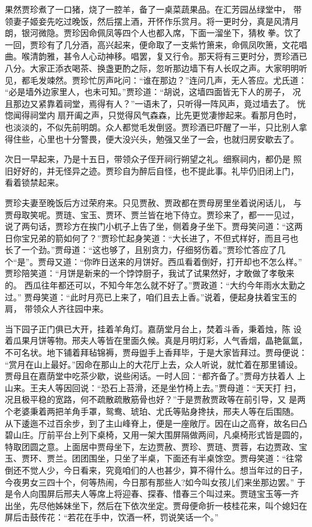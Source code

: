 果然贾珍煮了一口猪，烧了一腔羊，备了一桌菜蔬果品。在汇芳园丛绿堂中，
带领妻子姬妾先吃过晚饭，然后摆上酒，开怀作乐赏月。将一更时分，真是风清月
朗，银河微隐。贾珍因命佩凤等四个人也都入席，下面一溜坐下，猜枚拳。饮了
一回，贾珍有了几分酒，高兴起来，便命取了一支紫竹箫来，命佩凤吹箫，文花唱
曲。喉清韵雅，甚令人心动神移。唱罢，复又行令。那天将有三更时分，贾珍酒已
八分。大家正添衣喝茶、换盏更酌之际，忽听那边墙下有人长叹之声。大家明明听
见，都毛发竦然。贾珍忙厉声叱问：“谁在那边？”连问几声，无人答应。尤氏道：
“必是墙外边家里人，也未可知。”贾珍道：“胡说，这墙四面皆无下人的房子，
况且那边又紧靠着祠堂，焉得有人？”一语未了，只听得一阵风声，竟过墙去了。
恍惚闻得祠堂内扇开阖之声，只觉得风气森森，比先更觉凄惨起来。看那月色时，
也淡淡的，不似先前明朗。众人都觉毛发倒竖。贾珍酒已吓醒了一半，只比别人拿
得住些，心里也十分警畏，便大没兴头，勉强又坐了一会，也就归房安歇去了。

次日一早起来，乃是十五日，带领众子侄开祠行朔望之礼。细察祠内，都仍是
照旧好好的，并无怪异之迹。贾珍自为醉后自怪，也不提此事。礼毕仍旧闭上门，
看着锁禁起来。

贾珍夫妻至晚饭后方过荣府来。只见贾赦、贾政都在贾母房里坐着说闲话儿，
与贾母取笑呢。贾琏、宝玉、贾环、贾兰皆在地下侍立。贾珍来了，都一一见过，
说了两句话，贾珍方在挨门小杌子上告了坐，侧着身子坐下。贾母笑问道：“这两
日你宝兄弟的箭如何了？”贾珍忙起身笑道：“大长进了，不但式样好，而且弓也
长了一个劲。”贾母道：“这也够了，且别贪力，仔细努伤着。”贾珍忙答应了几
个“是”。贾母又道：“你昨日送来的月饼好。西瓜看着倒好，打开却也不怎么样。”
贾珍陪笑道：“月饼是新来的一个饽饽厨子，我试了试果然好，才敢做了孝敬来的。
西瓜往年都还可以，不知今年怎么就不好了。”贾政道：“大约今年雨水太勤之过。”
贾母笑道：“此时月亮已上来了，咱们且去上香。”说着，便起身扶着宝玉的肩，
带领众人齐往园中来。

当下园子正门俱已大开，挂着羊角灯。嘉荫堂月台上，焚着斗香，秉着烛，陈
设着瓜果月饼等物。邢夫人等皆在里面久候。真是月明灯彩，人气香烟，晶艳氤氲，
不可名状。地下铺着拜毡锦褥，贾母盥手上香拜毕，于是大家皆拜过。贾母便说：
“赏月在山上最好。”因命在那山上的大花厅上去，众人听说，就忙着在那里铺设。
贾母且在嘉荫堂中吃茶少歇，说些闲话。一时人回：“都齐备了。”贾母方扶着人
上山来。王夫人等因回说：“恐石上苔滑，还是坐竹椅上去。”贾母道：“天天打
扫，况且极平稳的宽路，何不疏散疏散筋骨也好？”于是贾赦贾政等在前引导，又
是两个老婆秉着两把羊角手罩，鸳鸯、琥珀、尤氏等贴身搀扶，邢夫人等在后围随。
从下逶迤不过百余步，到了主山峰脊上，便是一座敞厅。因在山之高脊，故名曰凸
碧山庄。厅前平台上列下桌椅，又用一架大围屏隔做两间，凡桌椅形式皆是圆的，
特取团圆之意。上面居中贾母坐下，左边贾赦、贾珍、贾琏、贾蓉，右边贾政、宝
玉、贾环、贾兰。团团围坐，只坐了半桌，下面还有半桌馀空。贾母笑道：“往常
倒还不觉人少，今日看来，究竟咱们的人也甚少，算不得什么。想当年过的日子，
今夜男女三四十个，何等热闹，今日那有那些人?如今叫女孩儿们来坐那边罢。”
于是令人向围屏后邢夫人等席上将迎春、探春、惜春三个叫过来。贾琏宝玉等一齐
出坐，先尽他姊妹坐下，然后在下依次坐定。贾母便命折一枝桂花来，叫个媳妇在
屏后击鼓传花：“若花在手中，饮酒一杯，罚说笑话一个。”

